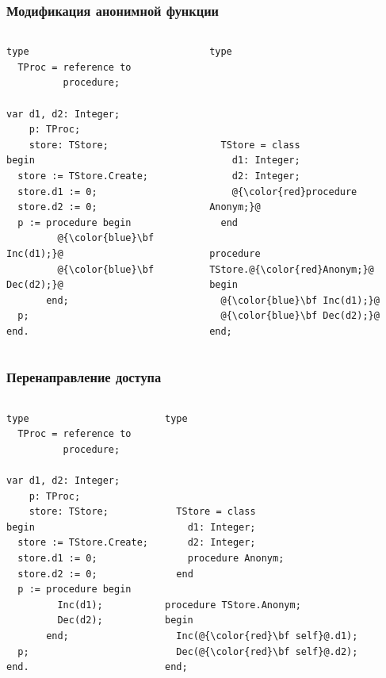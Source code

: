 \documentclass[roman,12pt]{beamer}
\begin{document}
\begin{frame}[fragile]
  \frametitle{Модификация анонимной функции}
  \begin{columns}[c]
    \column{2.2in}
     \begin{lstlisting}[escapechar=@,basicstyle=\footnotesize]
type 
  TProc = reference to
          procedure;

var d1, d2: Integer;
    p: TProc;
    store: TStore;
begin
  store := TStore.Create;
  store.d1 := 0;
  store.d2 := 0;
  p := procedure begin
         @{\color{blue}\bf Inc(d1);}@
         @{\color{blue}\bf Dec(d2);}@
       end;
  p;
end.
     \end{lstlisting}
   \column{2.2in}
     \begin{lstlisting}[escapechar=@,basicstyle=\footnotesize]  
type





  TStore = class
    d1: Integer;
    d2: Integer;
    @{\color{red}procedure Anonym;}@
  end
  
procedure TStore.@{\color{red}Anonym;}@
begin
  @{\color{blue}\bf Inc(d1);}@
  @{\color{blue}\bf Dec(d2);}@
end;

     \end{lstlisting}

  \end{columns}
\end{frame}

\begin{frame}[fragile]
  \frametitle{Перенаправление доступа}
  \begin{columns}[c]
    \column{2.2in}
     \begin{lstlisting}[escapechar=@,basicstyle=\footnotesize]
type 
  TProc = reference to
          procedure;

var d1, d2: Integer;
    p: TProc;
    store: TStore;
begin
  store := TStore.Create;
  store.d1 := 0;
  store.d2 := 0;
  p := procedure begin
         Inc(d1);
         Dec(d2);
       end;
  p;
end.
     \end{lstlisting}
   \column{2.2in}
     \begin{lstlisting}[escapechar=@,basicstyle=\footnotesize]  
type





  TStore = class
    d1: Integer;
    d2: Integer;
    procedure Anonym;
  end
  
procedure TStore.Anonym;
begin
  Inc(@{\color{red}\bf self}@.d1);
  Dec(@{\color{red}\bf self}@.d2);
end;

     \end{lstlisting}

  \end{columns}
\end{frame}
\end{document}
